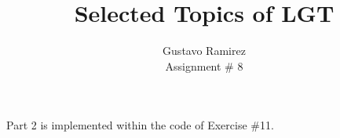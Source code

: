\documentclass[11pt]{article}
\title{\textbf{Selected Topics of LGT}}
\author{Gustavo Ramirez\\
		Assignment \# 8}
\date{}
\begin{document}
\maketitle

Part 2 is implemented within the code of Exercise {\#}11.
\end{document}
